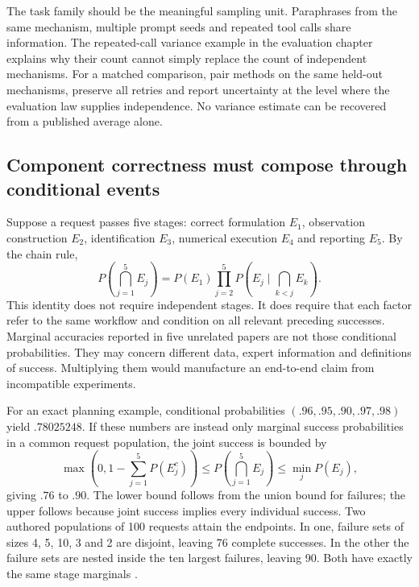 The task family should be the meaningful sampling unit. Paraphrases from the
same mechanism, multiple prompt seeds and repeated tool calls share information.
The repeated-call variance example in the evaluation chapter explains why
their count cannot simply replace the count of independent mechanisms. For a
matched comparison, pair methods on the same held-out mechanisms, preserve all
retries and report uncertainty at the level where the evaluation law supplies
independence. No variance estimate can be recovered from a published average
alone.

\subsection{Component correctness must compose through conditional events}

Suppose a request passes five stages: correct formulation $E_1$, observation
construction $E_2$, identification $E_3$, numerical execution $E_4$ and
reporting $E_5$. By the chain rule,
\begin{equation}
 P\!\left(\bigcap_{j=1}^5 E_j\right)
 =P(E_1)\prod_{j=2}^5P\!\left(E_j\mid\bigcap_{k<j}E_k\right).
 \label{exec13:frontier-chain}
\end{equation}
This identity does not require independent stages. It does require that each
factor refer to the same workflow and condition on all relevant preceding
successes. Marginal accuracies reported in five unrelated papers are not those
conditional probabilities. They may concern different data, expert information
and definitions of success. Multiplying them would manufacture an end-to-end
claim from incompatible experiments.

For an exact planning example, conditional probabilities
$(.96,.95,.90,.97,.98)$ yield $.78025248$. If these numbers are instead only
marginal success probabilities in a common request population, the joint
success is bounded by
\begin{equation}
 \max\!\left(0,1-\sum_{j=1}^5P(E_j^c)\right)
 \leq P\!\left(\bigcap_{j=1}^5 E_j\right)
 \leq\min_jP(E_j),
 \label{exec13:frontier-frechet}
\end{equation}
giving $.76$ to $.90$. The lower bound follows from the union bound for
failures; the upper follows because joint success implies every individual
success. Two authored populations of 100 requests attain the endpoints. In
one, failure sets of sizes 4, 5, 10, 3 and 2 are disjoint, leaving 76 complete
successes. In the other the failure sets are nested inside the ten largest
failures, leaving 90. Both have exactly the same stage marginals
\cite{exec13_frontier_exact}.

